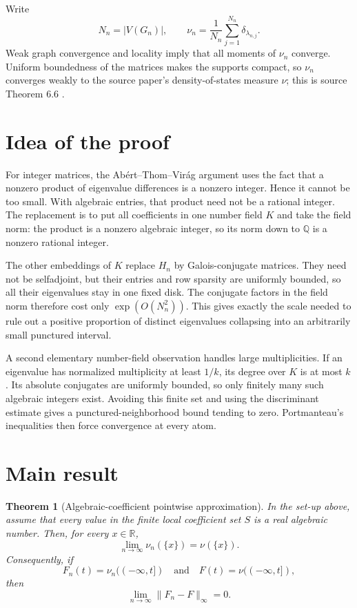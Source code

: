 \documentclass[11pt]{article}
\newtheorem{theorem}{Theorem}
\theoremstyle{definition}
\theoremstyle{remark}
\newcommand{\Q}{\mathbb{Q}}
\newcommand{\R}{\mathbb{R}}
\begin{document}
Write
\[
  N_n=|V(G_n)|,\qquad
  \nu_n=\frac1{N_n}\sum_{j=1}^{N_n}\delta_{\lambda_{n,j}} .
\]
Weak graph convergence and locality imply that all moments of $\nu_n$
converge.  Uniform boundedness of the matrices makes the supports compact, so
$\nu_n$ converges weakly to the source paper's density-of-states measure
$\nu$; this is source Theorem 6.6 \cite{Pogorzelski}.

\section{Idea of the proof}

For integer matrices, the Ab\'ert--Thom--Vir\'ag argument uses the fact that a
nonzero product of eigenvalue differences is a nonzero integer.  Hence it
cannot be too small.  With algebraic entries, that product need not be a
rational integer.  The replacement is to put all coefficients in one number
field $K$ and take the field norm: the product is a nonzero algebraic integer,
so its norm down to $\Q$ is a nonzero rational integer.

The other embeddings of $K$ replace $H_n$ by Galois-conjugate matrices.  They
need not be selfadjoint, but their entries and row sparsity are uniformly
bounded, so all their eigenvalues stay in one fixed disk.  The conjugate
factors in the field norm therefore cost only
$\exp(O(N_n^2))$.  This gives exactly the scale needed to rule out a positive
proportion of distinct eigenvalues collapsing into an arbitrarily small
punctured interval.

A second elementary number-field observation handles large multiplicities.
If an eigenvalue has normalized multiplicity at least $1/k$, its degree over
$K$ is at most $k$.  Its absolute conjugates are uniformly bounded, so only
finitely many such algebraic integers exist.  Avoiding this finite set and
using the discriminant estimate gives a punctured-neighborhood bound tending
to zero.  Portmanteau's inequalities then force convergence at every atom.

\section{Main result}

\begin{theorem}[Algebraic-coefficient pointwise approximation]
\label{thm:main}
In the set-up above, assume that every value in the finite local coefficient
set $S$ is a real algebraic number.  Then, for every $x\in\R$,
\[
             \lim_{n\to\infty}\nu_n(\{x\})=\nu(\{x\}).
\]
Consequently, if
\[
 F_n(t)=\nu_n((-\infty,t])\quad\text{and}\quad
 F(t)=\nu((-\infty,t]),
\]
then
\[
             \lim_{n\to\infty}\|F_n-F\|_\infty=0.
\]
\end{theorem}
\end{document}
